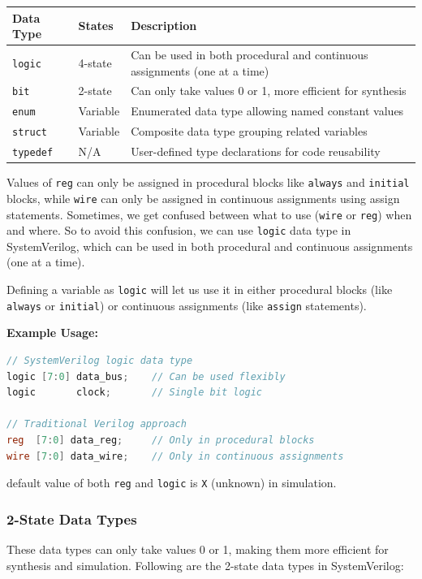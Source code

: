 \documentclass[12pt, a4paper]{article}
\begin{document}
\begin{center}
\begin{tabular}{|l|l|p{}|}
\hline
\textbf{Data Type} & \textbf{States} & \textbf{Description} \\
\hline
\texttt{logic} & 4-state & Can be used in both procedural and continuous assignments (one at a time) \\
\hline
\texttt{bit} & 2-state & Can only take values 0 or 1, more efficient for synthesis \\
\hline
\texttt{enum} & Variable & Enumerated data type allowing named constant values \\
\hline
\texttt{struct} & Variable & Composite data type grouping related variables \\
\hline
\texttt{typedef} & N/A & User-defined type declarations for code reusability \\
\hline
\end{tabular}
\end{center}

Values of \texttt{reg} can only be assigned in procedural blocks like \texttt{always}  and \texttt{initial} blocks, while \texttt{wire} can only be assigned in continuous assignments using assign statements. Sometimes, we get confused between what to use (\texttt{wire} or \texttt{reg}) when and where. So to avoid this confusion, we can use  \texttt{logic} data type in SystemVerilog, which can be used in both procedural and continuous assignments (one at a time).

\vspace{1em}

Defining a variable as \texttt{logic} will let us use it in either procedural blocks (like \texttt{always} or \texttt{initial}) or continuous assignments (like \texttt{assign} statements).

\textbf{Example Usage:}
\begin{lstlisting}[language=Verilog]
// SystemVerilog logic data type
logic [7:0] data_bus;    // Can be used flexibly
logic       clock;       // Single bit logic

// Traditional Verilog approach
reg  [7:0] data_reg;     // Only in procedural blocks  
wire [7:0] data_wire;    // Only in continuous assignments
\end{lstlisting}

default value of both \texttt{reg} and \texttt{logic} is \texttt{X} (unknown) in simulation.

\subsubsection{2-State Data Types}
These data types can only take values 0 or 1, making them more efficient for synthesis and simulation. Following are the 2-state data types in SystemVerilog:
\end{document}
